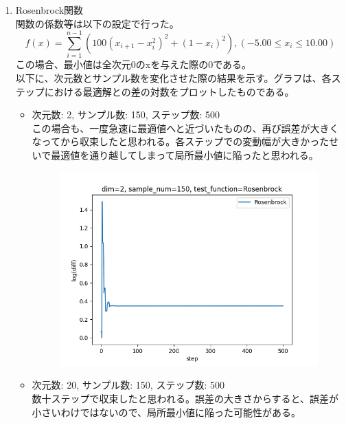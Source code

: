 \documentclass{jsarticle}
\begin{document}
\begin{enumerate}
\begin {itemize}
\begin{figure}[H]
                \end{figure}
        \end{itemize}
    \item Rosenbrock関数 \\
        関数の係数等は以下の設定で行った。
        \begin{equation}
            f(x) = \sum_{i=1}^{n-1} (100(x_{i+1} - x_i^2)^2 + (1 - x_i)^2),  (-5.00 \leq x_i \leq 10.00)
        \end{equation}
        この場合、最小値は全次元0のxを与えた際の0である。\\
        以下に、次元数とサンプル数を変化させた際の結果を示す。グラフは、各ステップにおける最適解との差の対数をプロットしたものである。
        \begin {itemize}
            \item 次元数: 2, サンプル数: 150, ステップ数: 500 \\
                この場合も、一度急速に最適値へと近づいたものの、再び誤差が大きくなってから収束したと思われる。各ステップでの変動幅が大きかったせいで最適値を通り越してしまって局所最小値に陥ったと思われる。 \\
                \begin{figure}[H]
                \includegraphics [width=10cm] {./result/Rosenbrock_N_2.png}
                \end{figure}
            \item 次元数: 20, サンプル数: 150, ステップ数: 500 \\
                数十ステップで収束したと思われる。誤差の大きさからすると、誤差が小さいわけではないので、局所最小値に陥った可能性がある。\\
                \begin{figure}[H]

\end{figure}
\end{itemize}
\end{enumerate}
\end{document}
